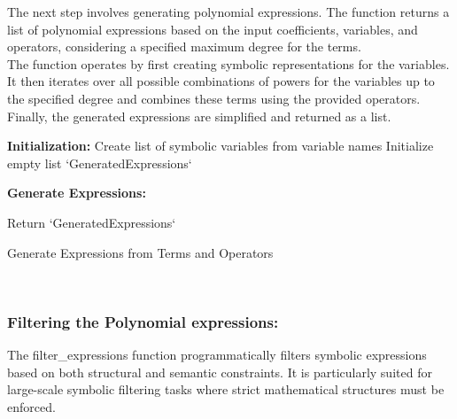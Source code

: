 \documentclass{article}
\begin{document}
The next step involves generating polynomial expressions. The function returns a list of polynomial expressions based on the input coefficients, variables, and operators, considering a specified maximum degree for the terms.\\

The function operates by first creating symbolic representations for the variables. It then iterates over all possible combinations of powers for the variables up to the specified degree and combines these terms using the provided operators. Finally, the generated expressions are simplified and returned as a list.\\





\begin{algorithm}[H]
\SetAlgoLined
{}

\textbf{Initialization:}\;
Create list of symbolic variables from variable names\;
Initialize empty list `GeneratedExpressions`\;

\textbf{Generate Expressions:}\;

Return `GeneratedExpressions`\;

\caption{Generate Expressions from Terms and Operators}
\label{alg:generate_expressions_terms} %
\end{algorithm}\\




\subsubsection{Filtering the Polynomial expressions:}


The filter\_expressions function programmatically filters symbolic expressions based on both structural and semantic constraints. It is particularly suited for large-scale symbolic filtering tasks where strict mathematical structures must be enforced.\\
\end{document}
